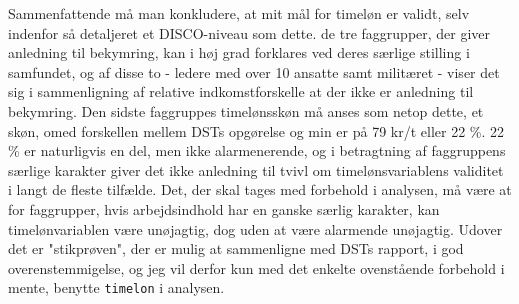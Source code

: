 Sammenfattende må man konkludere, at mit mål for timeløn er validt, selv indenfor så detaljeret et DISCO-niveau som dette. de tre faggrupper, der giver anledning til bekymring, kan i høj grad forklares ved deres særlige stilling i samfundet, og af disse to - ledere med over 10 ansatte samt militæret - viser det sig i sammenligning af relative indkomstforskelle at der ikke er anledning til bekymring. Den sidste faggruppes timelønsskøn må anses som netop dette, et skøn, omed forskellen mellem DSTs opgørelse og min er på 79 kr/t eller 22 \%. 22 \% er naturligvis en del, men ikke alarmenerende, og i betragtning af faggruppens særlige karakter giver det ikke anledning til tvivl om timelønsvariablens validitet i langt de fleste tilfælde. Det, der skal tages med forbehold i analysen, må være at for faggrupper, hvis arbejdsindhold har en ganske særlig karakter, kan timelønvariablen være unøjagtig, dog uden at være alarmende unøjagtig. 
Udover det er "stikprøven", der er mulig at sammenligne med DSTs rapport, i god overenstemmigelse, og jeg vil derfor kun med det enkelte ovenstående forbehold i mente, benytte \texttt{timelon} i analysen. 













